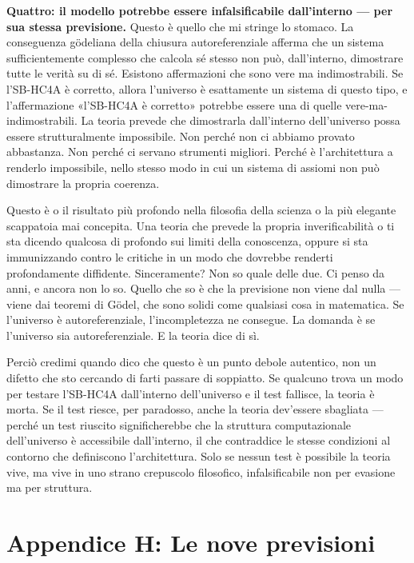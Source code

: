 \documentclass[11pt, twoside, openright]{book}
\begin{document}
\textbf{Quattro: il modello potrebbe essere infalsificabile dall'interno --- per sua stessa previsione.} Questo è quello che mi stringe lo stomaco. La conseguenza gödeliana della chiusura autoreferenziale afferma che un sistema sufficientemente complesso che calcola sé stesso non può, dall'interno, dimostrare tutte le verità su di sé. Esistono affermazioni che sono vere ma indimostrabili. Se l'SB-HC4A è corretto, allora l'universo è esattamente un sistema di questo tipo, e l'affermazione «l'SB-HC4A è corretto» potrebbe essere una di quelle vere-ma-indimostrabili. La teoria prevede che dimostrarla dall'interno dell'universo possa essere strutturalmente impossibile. Non perché non ci abbiamo provato abbastanza. Non perché ci servano strumenti migliori. Perché è l'architettura a renderlo impossibile, nello stesso modo in cui un sistema di assiomi non può dimostrare la propria coerenza.

Questo è o il risultato più profondo nella filosofia della scienza o la più elegante scappatoia mai concepita. Una teoria che prevede la propria inverificabilità o ti sta dicendo qualcosa di profondo sui limiti della conoscenza, oppure si sta immunizzando contro le critiche in un modo che dovrebbe renderti profondamente diffidente. Sinceramente? Non so quale delle due. Ci penso da anni, e ancora non lo so. Quello che so è che la previsione non viene dal nulla --- viene dai teoremi di Gödel, che sono solidi come qualsiasi cosa in matematica. Se l'universo è autoreferenziale, l'incompletezza ne consegue. La domanda è se l'universo sia autoreferenziale. E la teoria dice di sì.

Perciò credimi quando dico che questo è un punto debole autentico, non un difetto che sto cercando di farti passare di soppiatto. Se qualcuno trova un modo per testare l'SB-HC4A dall'interno dell'universo e il test fallisce, la teoria è morta. Se il test riesce, per paradosso, anche la teoria dev'essere sbagliata --- perché un test riuscito significherebbe che la struttura computazionale dell'universo è accessibile dall'interno, il che contraddice le stesse condizioni al contorno che definiscono l'architettura. Solo se nessun test è possibile la teoria vive, ma vive in uno strano crepuscolo filosofico, infalsificabile non per evasione ma per struttura.


\chapter*{Appendice H: Le nove previsioni}
\end{document}
